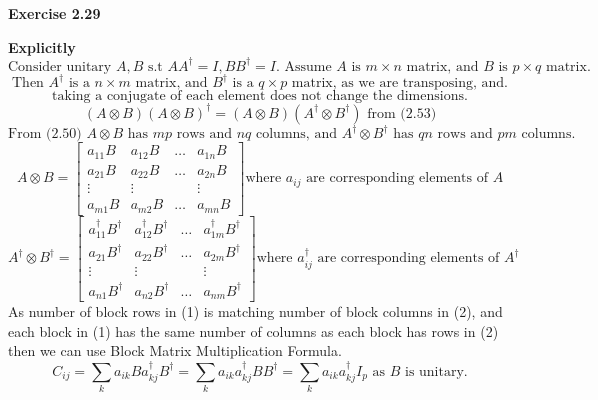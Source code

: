 \documentclass{article}
\begin{document}
\begin{framed}
    \noindent \textbf{Exercise 2.29}
    
    \medskip
\textbf{Explicitly}
    $$
    \text{Consider unitary } A, B \text{ s.t } AA^{\dagger} = I, BB^{\dagger}=I. \text{ Assume } A \text{ is } m\times n \text{ matrix, and } B \text{ is } p \times q \text{ matrix}.
    $$
    $$
    \text{Then }A^{\dagger} \text{ is a } n\times m \text{ matrix, and } B^{\dagger} \text{ is a } q\times p \text{ matrix, as we are transposing, and}.
    $$
    $$
    \text{taking a conjugate of each element does not change the dimensions.}
    $$
    $$
    (A \otimes B)(A \otimes B)^{\dagger} = (A \otimes B)(A^{\dagger} \otimes B^{\dagger}) \text{ from (2.53)} 
    $$
    $$
    \text{From (2.50) } A \otimes B \text{ has } mp \text{ rows and } nq \text{ columns, and 
 } A^{\dagger} \otimes B^{\dagger} \text{ has } qn \text{ rows and } pm \text{ columns.}
    $$
    \begin{equation}
    A \otimes B = 
    \begin{bmatrix}
    a_{11}B & a_{12}B & \dots & a_{1n}B\\
    a_{21}B & a_{22}B & \dots & a_{2n}B\\
    \vdots  & \vdots && \vdots\\
    a_{m1}B & a_{m2}B &\dots & a_{mn}B
    \end{bmatrix}
    \text{where } a_{ij} \text{ are corresponding elements of } A 
    \end{equation}
    \begin{equation}
    A^{\dagger} \otimes B^{\dagger} = 
    \begin{bmatrix}
    a^{\dagger}_{11}B^{\dagger} & a^{\dagger}_{12}B^{\dagger} & \dots & a^{\dagger}_{1m}B^{\dagger}\\
    a_{21}B^{\dagger} & a_{22}B^{\dagger} & \dots & a_{2m}B^{\dagger}\\
    \vdots  & \vdots && \vdots\\
    a_{n1}B^{\dagger} & a_{n2}B^{\dagger} &\dots & a_{nm}B^{\dagger}
    \end{bmatrix}
    \text{where } a^{\dagger}_{ij} \text{ are corresponding elements of } A^{\dagger}
    \end{equation}
    As number of block rows in (1) is matching number of block columns in (2), and each block in (1) has the same number of columns as each block has rows in (2) then we can use Block Matrix Multiplication Formula.
    \begin{equation}
        C_{ij} = \sum_{k}a_{ik}Ba^{\dagger}_{kj}B^{\dagger} = \sum_{k}{a_{ik}a^{\dagger}_{kj}BB^{\dagger}} = \sum_{k}{a_{ik}a^{\dagger}_{kj}I_p} \text{ as } B \text{ is unitary}.

\end{equation}
\end{framed}
\end{document}
